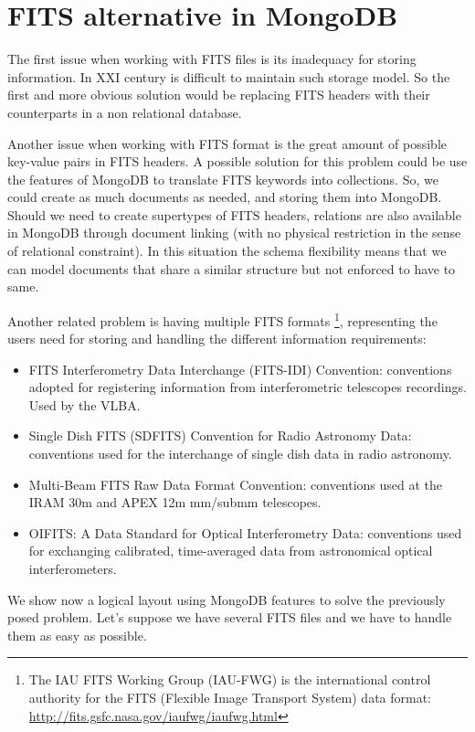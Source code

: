 \section{FITS alternative in MongoDB}

The first issue when working with FITS files is its inadequacy for storing information. In XXI century is difficult to maintain such storage model. So the first and more obvious solution would be replacing FITS headers with their counterparts in a non relational database. 

Another issue when working with FITS format is the great amount of possible key-value pairs in FITS headers. A possible solution for this problem could be use the features of MongoDB to translate FITS keywords into collections. So, we could create as much documents as needed, and storing them into MongoDB. Should we need to create supertypes of FITS headers, relations are also available in MongoDB through document linking (with no physical restriction in the sense of relational constraint). In this situation the schema flexibility means that we can model documents that share a similar structure but not enforced to have to same.

Another related problem is having multiple FITS formats \footnote{The IAU FITS Working Group (IAU-FWG) is the international control authority for the FITS (Flexible Image Transport System) data format: \url{http://fits.gsfc.nasa.gov/iaufwg/iaufwg.html}}, representing the users need for storing and handling the different information requirements:

\begin{itemize}
\item FITS Interferometry Data Interchange (FITS-IDI) Convention: conventions adopted for registering information from interferometric telescopes recordings. Used by the VLBA.
\item Single Dish FITS (SDFITS) Convention for Radio Astronomy Data: conventions used for the interchange of single dish data in radio astronomy. 
\item Multi-Beam FITS Raw Data Format Convention: conventions used at the IRAM 30m and APEX 12m mm/submm telescopes.
\item OIFITS: A Data Standard for Optical Interferometry Data: conventions used for exchanging calibrated, time-averaged data from astronomical optical interferometers.
\end{itemize}


We show now a logical layout using MongoDB features to solve the previously posed problem. Let's suppose we have several FITS files and we have to handle them as easy as possible.


